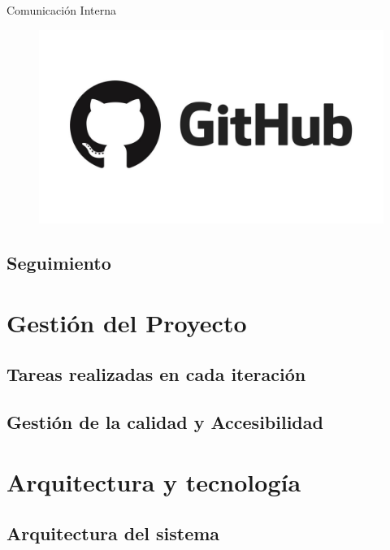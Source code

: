 \documentclass{beamer}
\begin{document}
\begin{frame}{Comunicaci\'on Interna}
\begin{figure}[H]
	\hspace{0.7cm}
	\includegraphics[width=0.35\paperwidth, height=0.4\paperheight]{images_latex/github}
	\end{figure}

\end{frame}

\subsection{Seguimiento}

\section{Gesti\'on del Proyecto}

\subsection{Tareas realizadas en cada iteraci\'on}

\subsection{Gesti\'on de la calidad y Accesibilidad}

\section{Arquitectura y tecnolog\'ia}

\subsection{Arquitectura del sistema}
\end{document}
